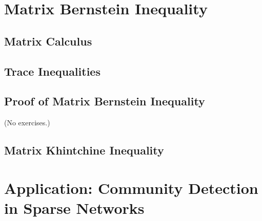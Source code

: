 \documentclass{report}
\theoremstyle{definition}
\newenvironment{exercise}[1]{
  \renewcommand\theexerciseimpl{#1}
  \exerciseimpl
}{\endexerciseimpl}
\begin{document}
\section{Matrix Bernstein Inequality}

\subsection{Matrix Calculus}

\begin{exercise}{5.4.3}
\end{exercise}

\begin{exercise}{5.4.5}
\end{exercise}

\subsection{Trace Inequalities}

\begin{exercise}{5.4.6}
\end{exercise}

\subsection{Proof of Matrix Bernstein Inequality}

(No exercises.)

\subsection{Matrix Khintchine Inequality}

\begin{exercise}{5.4.11}
\end{exercise}

\begin{exercise}{5.4.12}
\end{exercise}

\begin{exercise}{5.4.13}
\end{exercise}

\begin{exercise}{5.4.14}
\end{exercise}

\begin{exercise}{5.4.15}
\end{exercise}

\section{Application: Community Detection in Sparse Networks}
\end{document}
